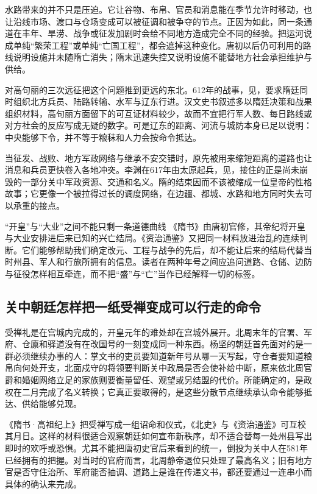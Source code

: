水路带来的并不只是压迫。它让谷物、布帛、官员和消息能在季节允许时移动，也让沿线市场、渡口与仓场变成可以被征调和被争夺的节点。正因为如此，同一条通道在丰年、旱涝、战争或征发加剧时会给不同地方造成完全不同的经验。把运河说成单纯“繁荣工程”或单纯“亡国工程”，都会遮掉这种变化。唐初以后仍可利用的路线说明设施并未随隋亡消失；隋末迅速失控又说明设施不能替地方社会承担维护与供给。

对高句丽的三次远征把这个问题推到更远的东北。612年的战事，见，要求隋廷同时组织北方兵员、陆路转输、水军与辽东行进。汉文史书叙述多以隋廷决策和战果组织材料，高句丽方面留下的可互证材料较少，故而不宜把行军人数、每日路线或对方社会的反应写成无疑的数字。可是辽东的距离、河流与城防本身已足以说明：中央能够下令，并不等于粮秣和人力会按命令抵达。

当征发、战败、地方军政网络与继承不安交错时，原先被用来缩短距离的道路也让消息和兵员更快卷入各地冲突。李渊在617年由太原起兵，见，接住的正是尚未崩毁的一部分关中军政资源、交通和名义。隋的结束因而不该被缩成一位皇帝的性格故事；它更像一个被拉得过长的调度网络，在边疆、都城、水路和地方同时失去可以承重的接点。

\begin{textwindow}{“开皇”与“大业”之间不能只剩一条道德曲线}
《隋书》由唐初官修，其帝纪将开皇与大业安排进后来已知的兴亡结局。《资治通鉴》又把同一材料放进治乱的连续判断。它们能够帮助我们确定改元、工程与战争的先后，却不能让后来的结局代替当时州县、军人和行旅所拥有的信息。读者在两种年号之间应追问道路、仓储、边防与征役怎样相互牵连，而不把“盛”与“亡”当作已经解释一切的标签。
\end{textwindow}

\subsection{关中朝廷怎样把一纸受禅变成可以行走的命令}
受禅礼是在宫城内完成的，开皇元年的难处却在宫城外展开。北周末年的官署、军府、仓廪和驿道没有在改国号的一刻变成同一种东西。杨坚的朝廷首先面对的是一群必须继续办事的人：掌文书的吏员要知道新年号从哪一天写起，守仓者要知道粮帛向何处开支，北面戍守的将领要判断关中政局是否会使补给中断，原来依北周官爵和婚姻网络立足的家族则要衡量留任、观望或另结盟的代价。所能确定的，是政权在二月完成了名义转换；它真正要取得的，是这些分散节点继续承认命令能够抵达、供给能够兑现。

《隋书·高祖纪上》把受禅写成一组诏命和仪式，《北史》与《资治通鉴》可互校其月日。这样的材料很适合观察朝廷如何宣布新秩序，却不适合替每一处州县写出即时的欢呼或恐惧。尤其不能把唐初史官后来看到的统一，倒投为关中人在581年已经拥有的把握。对当时的官府而言，北周静帝退位只处理了最高名义；旧有地方官是否守住治所、军府能否抽调、道路上是谁在传递文书，都还要通过一连串小而具体的确认来完成。

